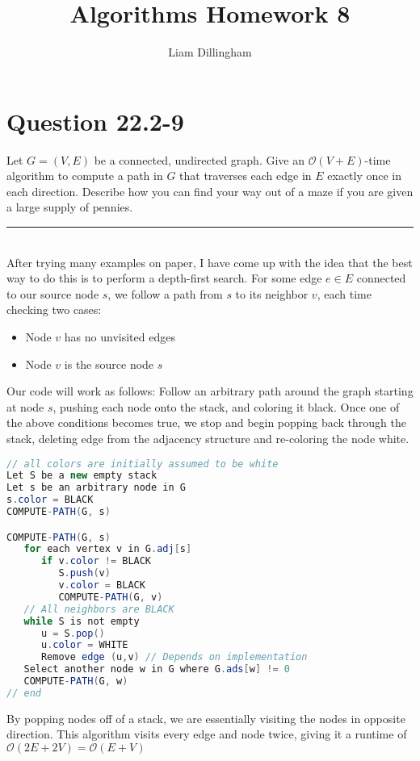 \documentclass[20pt]{article} %
\title{Algorithms Homework 8}
\author{Liam Dillingham}
\begin{document}
\maketitle

\section{Question 22.2-9} 
Let $G = (V, E)$ be a connected, undirected graph. Give an $\mathcal{O}(V + E)$-time algorithm to compute a path in $G$ that traverses each edge in $E$ exactly once in each direction. Describe how you can find your way out of a maze if you are given a large supply of pennies. \\
\noindent\rule{2cm}{0.4pt} \\

After trying many examples on paper, I have come up with the idea that the best way to do this is to perform a depth-first search.  For some edge $e \in E$ connected to our source node $s$, we follow a path from $s$ to its neighbor $v$, each time checking two cases: 

\begin{itemize}
\item Node $v$ has no unvisited edges
\item Node $v$ is the source node $s$
\end{itemize}

Our code will work as follows: 
Follow an arbitrary path around the graph starting at node $s$, pushing each node onto the stack, and coloring it black.  Once one of the above conditions becomes true, we stop and begin popping back through the stack, deleting edge from the adjacency structure and re-coloring the node white.

\newpage
\begin{lstlisting}[language=java]
// all colors are initially assumed to be white
Let S be a new empty stack
Let s be an arbitrary node in G
s.color = BLACK
COMPUTE-PATH(G, s)

COMPUTE-PATH(G, s)
   for each vertex v in G.adj[s]
      if v.color != BLACK
         S.push(v)
         v.color = BLACK
         COMPUTE-PATH(G, v)
   // All neighbors are BLACK
   while S is not empty
      u = S.pop()
      u.color = WHITE
      Remove edge (u,v) // Depends on implementation
   Select another node w in G where G.ads[w] != 0
   COMPUTE-PATH(G, w)
// end
\end{lstlisting}

By popping nodes off of a stack, we are essentially visiting the nodes in opposite direction.  This algorithm visits every edge and node twice, giving it a runtime of $\mathcal{O}(2E + 2V) = \mathcal{O}(E + V)$
\end{document}
